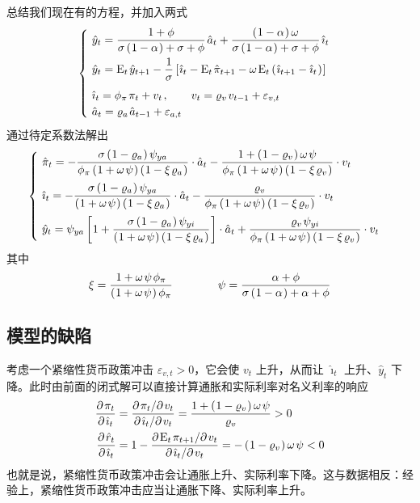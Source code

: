 总结我们现在有的方程，并加入两式
\begin{equation*}
    \begin{cases}
        \ \hat y_t=\dfrac{1+\phi}{\sigma\bka{1-\alpha}+\sigma+\phi}\,\hat a_t+\dfrac{\bka{1-\alpha}\omega}{\sigma\bka{1-\alpha}+\sigma+\phi}\,\hat\imath_t\\[2ex]
        \ \hat y_t=\meant\,\hat y\nt-\dfrac{1}{\sigma}\bks{\hat\imath_t-\meant\,\hat\pi\nt-\omega\,\meant\bka{\hat\imath\nt-\hat\imath_t}}\\[2ex]
        \ \hat\imath_t=\phi_\pi\,\pi_t+v_t\,,\qquad v_t=\varrho_v\,v\lt+\varepsilon_{v,t}\\
        \ \hat a_t=\varrho_a\,\hat a\lt+\varepsilon_{a,t}
    \end{cases}
\end{equation*}
通过待定系数法解出
\begin{equation*}
    \begin{cases}
        \ \hat \pi_t=-\dfrac{\sigma\bka{1-\varrho_a}\psi_{ya}}{\phi_\pi\bka{1+\omega\,\psi}\bka{1-\xi\,\varrho_a}}\cdot\hat a_t-\dfrac{1+\bka{1-\varrho_v}\omega\,\psi}{\phi_\pi\bka{1+\omega\,\psi}\bka{1-\xi\,\varrho_v}}\cdot v_t\\[2.5ex]
        \ \hat\imath_t=-\dfrac{\sigma\bka{1-\varrho_a}\psi_{ya}}{\bka{1+\omega\,\psi}\bka{1-\xi\,\varrho_a}}\cdot\hat a_t-\dfrac{\varrho_v}{\phi_\pi\bka{1+\omega\,\psi}\bka{1-\xi\,\varrho_v}}\cdot v_t\\[2.5ex]
        \ \hat y_t=\psi_{ya}\bks{1+\dfrac{\sigma\bka{1-\varrho_a}\psi_{yi}}{\bka{1+\omega\,\psi}\bka{1-\xi\,\varrho_a}}}\cdot\hat a_t+\dfrac{\varrho_v\,\psi_{yi}}{\phi_\pi\bka{1+\omega\,\psi}\bka{1-\xi\,\varrho_v}}\cdot v_t
    \end{cases}
\end{equation*}
其中
\begin{align*}
    \xi=\dfrac{1+\omega\,\psi\,\phi_\pi}{\bka{1+\omega\,\psi}\phi_\pi}\qquad\qquad \psi=\dfrac{\alpha+\phi}{\sigma\bka{1-\alpha}+\alpha+\phi}
\end{align*}

\subsection{模型的缺陷}

考虑一个紧缩性货币政策冲击 \(\varepsilon_{v,t}>0\)，它会使 \(v_t\) 上升，从而让 \(\hat\imath_t\) 上升、\(\hat y_t\) 下降。此时由前面的闭式解可以直接计算通胀和实际利率对名义利率的响应
\begin{align*}
    \dfrac{\partial\,\pi_t}{\partial\,\hat\imath_t}
    &=\dfrac{\partial\,\pi_t/\partial\, v_t}{\partial\,\hat\imath_t/\partial\, v_t}
    =\dfrac{1+\bka{1-\varrho_v}\omega\,\psi}{\varrho_v}>0\\
    \dfrac{\partial\,\hat r_t}{\partial\,\hat\imath_t}
    &=1-\dfrac{\partial\, \meant\,\pi\nt/\partial\, v_t}{\partial\,\hat\imath_t/\partial\, v_t}
    =-\bka{1-\varrho_v}\omega\,\psi<0
\end{align*}
也就是说，紧缩性货币政策冲击会让通胀上升、实际利率下降。这与数据相反：经验上，紧缩性货币政策冲击应当让通胀下降、实际利率上升。

